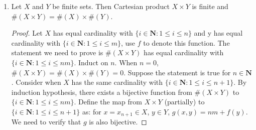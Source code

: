 \documentclass[12pt, letter]{article}
\begin{document}
\begin{enumerate}
\begin{proof}
         If $f$ is one-to-one, the proof is similar and we only need to modify a bit from the previous one. The proof of the base case stays the same. Suppose inductively $\#(f(X))=\#(X)$. Now 
         $f(\{x_1,\dotsc,x_{n+1}\})=f(\{x_1,\dotsc,x_n\})\cup f(x_{n+1})$, since $f$ is injective, these two sets are disjoint. By Proposition 3.6.14.(b), $\#(f\{x_1,\dotsc,x_{n+1}\})=\#(X)+1=\#(\{x_1,\dotsc,x_{n+1}\})$.
         This closes the induction.
    \end{proof}
    \item Let $X$ and $Y$ be finite sets. Then Cartesian product $X\times Y$ is finite and $\#(X\times Y)=\#(X)\times \#(Y)$.
    \begin{proof}
        Let $X$ has equal cardinality with $\{i\in\mathbf{N}:1\leq i\leq n\}$ and y has equal cardinality with $\{i\in\mathbf{N}:1\leq i\leq m\}$, use $f$ to denote this function. The statement we need to prove is $\#(X\times Y)$ 
        has equal cardinality with $\{i\in\mathbf{N}:1\leq i\leq nm\}$. Induct on $n$. When $n=0$, $\#(X\times Y)=\#(X)\times \#(Y)=0$. Suppose the statement is true for $n\in\mathbf{N}$. Consider when 
        $X$ has the same cardinality with $\{i\in\mathbf{N}:1\leq i\leq n+1\}$. By induction hypothesis, there exists a bijective function from $\#(X\times Y)$ to $\{i\in\mathbf{N}:1\leq i\leq nm\}$. Define the map from $X\times Y$ (partially)
        to $\{i\in\mathbf{N}:1\leq i\leq n+1\}$ as: for $x=x_{n+1}\in X$, $y\in Y$, $g(x,y)=nm+f(y)$. We need to verify that $g$ is also bijective. 


\end{proof}
\end{enumerate}
\end{document}
